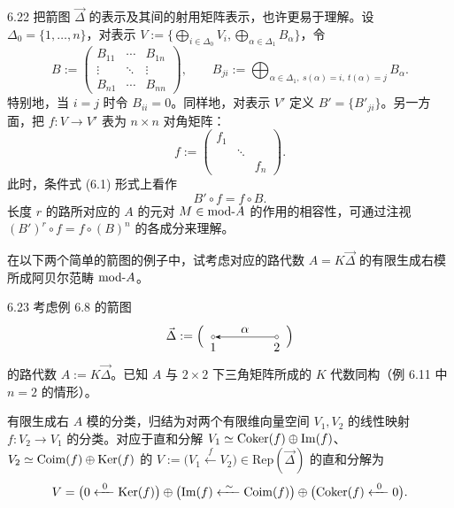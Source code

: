 \begin{remark}{6.22}
把箭图 $\vec{\Delta}$ 的表示及其间的射用矩阵表示，也许更易于理解。设 $\Delta_0=\{1,\dots,n\}$，对表示 $V:=\{\bigoplus_{i\in\Delta_0}V_i,\bigoplus_{\alpha\in\Delta_1}B_\alpha\}$，令
\[
B:=
\begin{pmatrix}
B_{11} & \cdots & B_{1n}\\
\vdots & \ddots & \vdots\\
B_{n1} & \cdots & B_{nn}
\end{pmatrix},
\qquad
B_{ji}:=\bigoplus_{\alpha\in\Delta_1,\ s(\alpha)=i,\ t(\alpha)=j}B_\alpha.
\]
特别地，当 $i=j$ 时令 $B_{ii}=0$。同样地，对表示 $V'$ 定义 $B'=\{B'_{ji}\}$。另一方面，把 $f\colon V\to V'$ 表为 $n\times n$ 对角矩阵：
\[
f:=
\begin{pmatrix}
f_1 & & \\
& \ddots & \\
& & f_n
\end{pmatrix}.
\]
此时，条件式 (6.1) 形式上看作
\[
B'\circ f=f\circ B.
\]
长度 $r$ 的路所对应的 $A$ 的元对 $M\in\mathrm{mod}\text{-}A$ 的作用的相容性，可通过注视 $(B')^r\circ f=f\circ(B)^n$ 的各成分来理解。
\end{remark}


在以下两个简单的箭图的例子中，试考虑对应的路代数 $A=K\vec{\Delta}$ 的有限生成右模所成阿贝尔范畴 $\mathrm{mod}\text{-}A$。

\begin{example}{6.23}
考虑例 6.8 的箭图
\[
\vec{\Delta}:=\Bigl(\,
\begin{tikzpicture}[baseline=-0.5ex]
  \node[draw,circle,inner sep=1pt,label=below:{$1$}] (v1) at (0,0) {};
  \node[draw,circle,inner sep=1pt,label=below:{$2$}] (v2) at (1.8,0) {};
  \draw[-{Stealth}] (v2) -- node[above]{$\alpha$} (v1);
\end{tikzpicture}
\,\Bigr)
\]
的路代数 $A:=K\vec{\Delta}$。已知 $A$ 与 $2\times 2$ 下三角矩阵所成的 $K$ 代数同构（例 6.11 中 $n=2$ 的情形）。

有限生成右 $A$ 模的分类，归结为对两个有限维向量空间 $V_1,V_2$ 的线性映射 $f\colon V_2\to V_1$ 的分类。对应于直和分解 $V_1\simeq\operatorname{Coker}(f)\oplus\operatorname{Im}(f)$、$V_2\simeq\operatorname{Coim}(f)\oplus\operatorname{Ker}(f)$ 的 $V:=\bigl(V_1\xleftarrow{\ f\ }V_2\bigr)\in\mathrm{Rep}(\vec{\Delta})$ 的直和分解为
\[
V=\bigl(0\xleftarrow{\ 0\ }\Ker(f)\bigr)\oplus
\bigl(\Img(f)\xleftarrow{\ \sim\ }\Coim(f)\bigr)\oplus
\bigl(\Coker(f)\xleftarrow{\ 0\ }0\bigr).
\]
\end{example}

